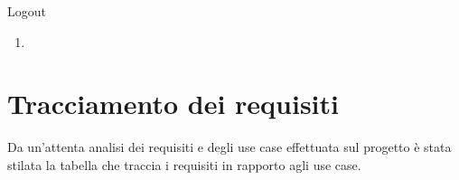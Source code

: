 \begin{usecase}{18}{Logout}\label{uc:}
    \usecasepre{}
    \usecasedesc{}
    \usecasepost{}

    \usecasemain{}
        \begin{enumerate}
            \item 
        \end{enumerate}

\end{usecase}








\section{Tracciamento dei requisiti}

Da un'attenta analisi dei requisiti e degli use case effettuata sul progetto è stata stilata la tabella che traccia i requisiti in rapporto agli use case.\\

